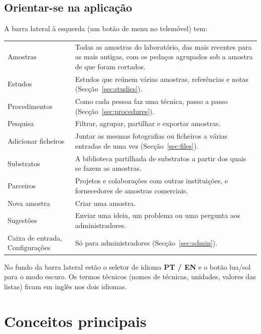 \documentclass[11pt,a4paper]{article}
\newcommand{\ui}[1]{\textsf{\textbf{#1}}}
\newcommand{\menu}[1]{\textsf{#1}}
\begin{document}
\subsection{Orientar-se na aplicação}

A barra lateral à esquerda (um botão de menu no telemóvel) tem:

\begin{center}
\begin{tabularx}{\linewidth}{@{}lX@{}}
\toprule
\menu{Amostras}       & Todas as amostras do laboratório, das mais recentes para as mais antigas, com os pedaços agrupados sob a amostra de que foram cortados. \\
\menu{Estudos}        & Estudos que reúnem várias amostras, referências e notas (Secção~\ref{sec:studies}). \\
\menu{Procedimentos}  & Como cada pessoa faz uma técnica, passo a passo (Secção~\ref{sec:procedures}). \\
\menu{Pesquisa}       & Filtrar, agrupar, partilhar e exportar amostras. \\
\menu{Adicionar ficheiros} & Juntar as mesmas fotografias ou ficheiros a várias entradas de uma vez (Secção~\ref{sec:files}). \\
\menu{Substratos}     & A biblioteca partilhada de substratos a partir dos quais se fazem as amostras. \\
\menu{Parceiros}      & Projetos e colaborações com outras instituições, e fornecedores de amostras comerciais. \\
\menu{Nova amostra}   & Criar uma amostra. \\
\menu{Sugestões}      & Enviar uma ideia, um problema ou uma pergunta aos administradores. \\
\menu{Caixa de entrada}, \menu{Configurações} & Só para administradores (Secção~\ref{sec:admin}). \\
\bottomrule
\end{tabularx}
\end{center}

No fundo da barra lateral estão o seletor de idioma \ui{PT / EN} e o botão
lua/sol para o modo escuro. Os termos técnicos (nomes de técnicas, unidades,
valores das listas) ficam em inglês nos dois idiomas.

\section{Conceitos principais}
\end{document}
